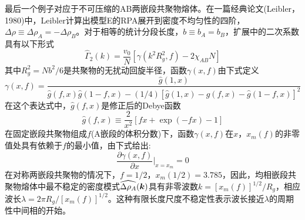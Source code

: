 最后一个例子对应于不可压缩的AB两嵌段共聚物熔体。在一篇经典论文(Leibler，1980)中，Leibler计算出模型E的RPA展开到密度不均匀性的四阶，$\Delta\rho\equiv\Delta\rho_A=-\Delta\rho_B$。对于相等的统计分段长度，$b\equiv b_A=b_B$，扩展中的二次系数具有以下形式
\begin{equation}
\hat{\Gamma}_2(k)=\frac{v_0}{N}\left[\gamma(k^2R_g^2,f)-2\chi_{AB}N\right]
\end{equation}
其中$R_g^2=Nb^2/6$是共聚物的无扰动回旋半径，函数$\gamma(x,f)$由下式定义
\begin{equation}
\gamma(x,f)=\frac{\hat{g}(1,x)}{\hat{g}(f,x)\hat{g}(1-f,x)-(1/4)[\hat{g}(1,x)-\hat{g}(f,x)-\hat{g}(1-f,x)]^2}
\end{equation}
在这个表达式中，$\hat{g}(f,x)$是修正后的Debye函数
\begin{equation}
\hat{g}(f,x)\equiv\frac{2}{x^2}[fx+\exp(-fx)-1]
\end{equation}
在固定嵌段共聚物组成$f$(A嵌段的体积分数)下，函数$\gamma(x,f)$在$x$，$x_m(f)$的非零值处具有依赖于$f$的最小值，由下式给出:
\begin{equation}
\frac{\partial\gamma(x,f)}{\partial x}\bigg|_{x=x_m}=0
\end{equation}
在对称两嵌段共聚物的情况下，$f=1/2$，$x_m(1/2)=3.785$，因此，均相嵌段共聚物熔体中最不稳定的密度模式$\widehat{\Delta\rho_A}(\bm{k})$具有非零波数$k=[x_m(f)]^{1/2}/R_g$，相应波长$\lambda=2\pi R_g/[x_m(f)]^{1/2}$。这种有限长度尺度不稳定性表示波长接近$\lambda$的周期性中间相的开始。

